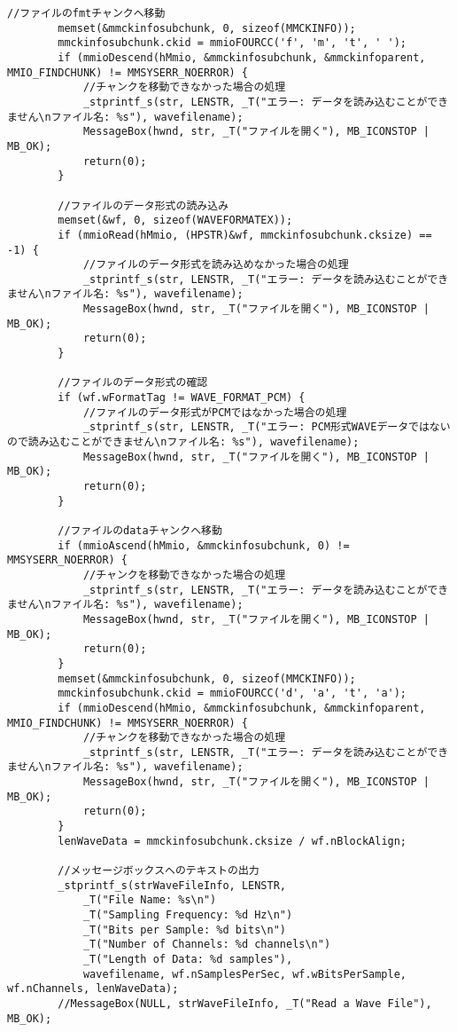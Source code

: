 \begin{lstlisting}[caption=main.cpp]
		//ファイルのfmtチャンクへ移動
		memset(&mmckinfosubchunk, 0, sizeof(MMCKINFO));
		mmckinfosubchunk.ckid = mmioFOURCC('f', 'm', 't', ' ');
		if (mmioDescend(hMmio, &mmckinfosubchunk, &mmckinfoparent, MMIO_FINDCHUNK) != MMSYSERR_NOERROR) {
			//チャンクを移動できなかった場合の処理
			_stprintf_s(str, LENSTR, _T("エラー: データを読み込むことができません\nファイル名: %s"), wavefilename);
			MessageBox(hwnd, str, _T("ファイルを開く"), MB_ICONSTOP | MB_OK);
			return(0);
		}

		//ファイルのデータ形式の読み込み
		memset(&wf, 0, sizeof(WAVEFORMATEX));
		if (mmioRead(hMmio, (HPSTR)&wf, mmckinfosubchunk.cksize) == -1) {
			//ファイルのデータ形式を読み込めなかった場合の処理
			_stprintf_s(str, LENSTR, _T("エラー: データを読み込むことができません\nファイル名: %s"), wavefilename);
			MessageBox(hwnd, str, _T("ファイルを開く"), MB_ICONSTOP | MB_OK);
			return(0);
		}

		//ファイルのデータ形式の確認
		if (wf.wFormatTag != WAVE_FORMAT_PCM) {
			//ファイルのデータ形式がPCMではなかった場合の処理
			_stprintf_s(str, LENSTR, _T("エラー: PCM形式WAVEデータではないので読み込むことができません\nファイル名: %s"), wavefilename);
			MessageBox(hwnd, str, _T("ファイルを開く"), MB_ICONSTOP | MB_OK);
			return(0);
		}

		//ファイルのdataチャンクへ移動
		if (mmioAscend(hMmio, &mmckinfosubchunk, 0) != MMSYSERR_NOERROR) {
			//チャンクを移動できなかった場合の処理
			_stprintf_s(str, LENSTR, _T("エラー: データを読み込むことができません\nファイル名: %s"), wavefilename);
			MessageBox(hwnd, str, _T("ファイルを開く"), MB_ICONSTOP | MB_OK);
			return(0);
		}
		memset(&mmckinfosubchunk, 0, sizeof(MMCKINFO));
		mmckinfosubchunk.ckid = mmioFOURCC('d', 'a', 't', 'a');
		if (mmioDescend(hMmio, &mmckinfosubchunk, &mmckinfoparent, MMIO_FINDCHUNK) != MMSYSERR_NOERROR) {
			//チャンクを移動できなかった場合の処理
			_stprintf_s(str, LENSTR, _T("エラー: データを読み込むことができません\nファイル名: %s"), wavefilename);
			MessageBox(hwnd, str, _T("ファイルを開く"), MB_ICONSTOP | MB_OK);
			return(0);
		}
		lenWaveData = mmckinfosubchunk.cksize / wf.nBlockAlign;

		//メッセージボックスへのテキストの出力
		_stprintf_s(strWaveFileInfo, LENSTR,
			_T("File Name: %s\n")
			_T("Sampling Frequency: %d Hz\n")
			_T("Bits per Sample: %d bits\n")
			_T("Number of Channels: %d channels\n")
			_T("Length of Data: %d samples"),
			wavefilename, wf.nSamplesPerSec, wf.wBitsPerSample, wf.nChannels, lenWaveData);
		//MessageBox(NULL, strWaveFileInfo, _T("Read a Wave File"), MB_OK);


\end{lstlisting}
